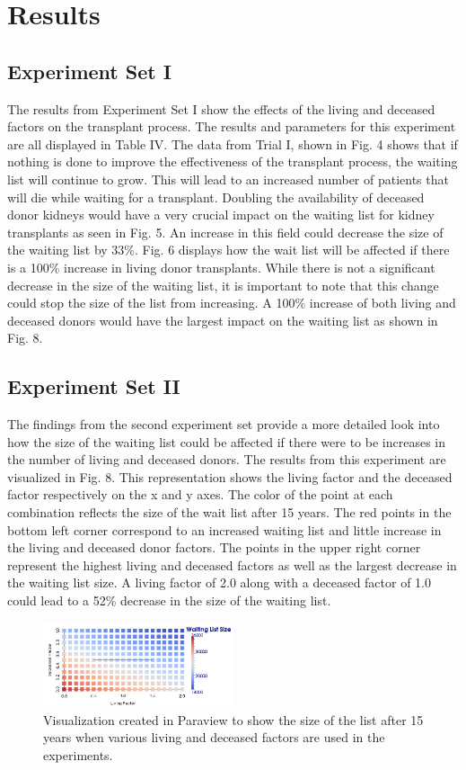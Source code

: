 \documentclass[9pt,a4paper,twocolumn]{scrartcl}
\begin{document}
\section{Results}
\subsection{Experiment Set I}
The results from Experiment Set I show the effects of the living and deceased factors on the transplant process.  The results and parameters for this experiment are all displayed in Table IV.  The data from Trial I, shown in Fig. 4 shows that if nothing is done to improve the effectiveness of the transplant process, the waiting list will continue to grow.  This will lead to an increased number of patients that will die while waiting for a transplant.
Doubling the availability of deceased donor kidneys would have a very crucial impact on the waiting list for kidney transplants as seen in Fig. 5.  An increase in this field could decrease the size of the waiting list by 33\%.  Fig. 6 displays how the wait list will be affected if there is a 100\% increase in living donor transplants.  While there is not a significant decrease in the size of the waiting list, it is important to note that this change could stop the size of the list from increasing.  A 100\% increase of both living and deceased donors would have the largest impact on the waiting list as shown in Fig. 8.

\subsection{Experiment Set II}
The findings from the second experiment set provide a more detailed look into how the size of the waiting list could be affected if there were to be increases in the number of living and deceased donors.  The results from this experiment are visualized in Fig. 8.  This representation shows the living factor and the deceased factor respectively on the x and y axes.  The color of the point at each combination reflects the size of the wait list after 15 years.  The red points in the bottom left corner correspond to an increased waiting list and little increase in the living and deceased donor factors.  The points in the upper right corner represent the highest living and deceased factors as well as the largest decrease in the waiting list size.  A living factor of 2.0 along with a deceased factor of 1.0 could lead to a 52\% decrease in the size of the waiting list.

\begin{figure}[h!]
  \caption{Visualization created in Paraview to show the size of the list after 15 years when various living and deceased factors are used in the experiments.}
  \centering
    \includegraphics[width=0.5\textwidth]{MEGOut}
\end{figure}
\end{document}
